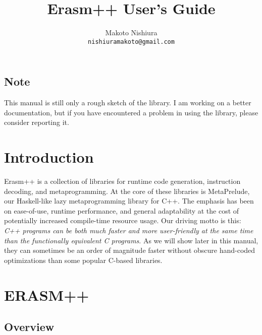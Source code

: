\documentclass{article}
\begin{document}
\lstset{language=C++}

\title{Erasm++ User's Guide}
\author{Makoto Nishiura \\
\texttt{nishiuramakoto@gmail.com}}

\maketitle

\tableofcontents

\subsection*{Note}
This manual is still only a rough sketch of the library.
I  am working on a better documentation, but if you have encountered a
problem in using the library, please consider reporting it.


\section{Introduction}
\label{sec:introduction}

Erasm++ is a collection of libraries for runtime code generation,
instruction decoding, and metaprogramming. At the core of these
libraries is MetaPrelude, our Haskell-like lazy metaprogramming
library for C++. The emphasis has been on ease-of-use, runtime
performance, and general adaptability at the cost of potentially
increased compile-time resource usage. Our driving motto is this:
\emph{C++ programs can be both much faster and more user-friendly at
  the same time than the functionally equivalent C programs}. As we
will show later in this manual, they can sometimes be an order of
magnitude faster without obscure hand-coded optimizations than some
popular C-based libraries.

\section{ERASM++}
\label{sec:erasm++}

\subsection{Overview}
\label{sec:overview}
\end{document}
